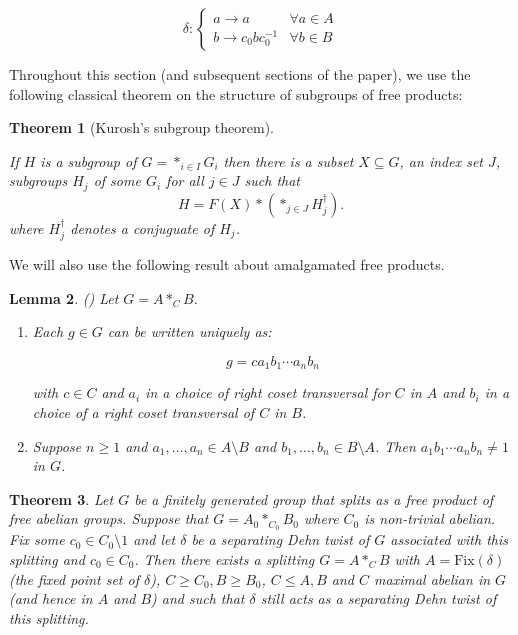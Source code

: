 \documentclass{amsart}
\theoremstyle{plain}
\newtheorem{thm}{Theorem}[section]
\newtheorem{lemma}[thm]{Lemma}
\theoremstyle{definition}
\theoremstyle{remark}
\begin{document}
$$ \delta : \begin{cases}
    a \to a & \forall a \in A \\
    b \to c_0bc_0^{-1} & \forall b \in B
\end{cases} $$

Throughout this section (and subsequent sections of the paper), we use the following classical theorem on the structure of subgroups of free products:

\begin{thm}[Kurosh's subgroup theorem]\cite[Theorem 3.01]{Kuhn}
\label{thm:Kurosh}

If $H$ is a subgroup of $G=*_{i \in I} G_i$ then there is a subset $X \subseteq G$, an index set $J$, subgroups $H_j$ of some $G_i$ for all $j \in J$ such that $$H=F(X) * (*_{j \in J} H_j^{\dag}).$$ 
where $H_j^{\dag}$ denotes a conjuguate of $H_j$. 
\end{thm}

We will also use the following result about amalgamated free products.

\begin{lemma}(\cite[Theorem 2.6]{Lyndon_Schupp})
    \label{lemma: normal form theorem for amalgamated free products}
    Let $G = A *_C B$. 
    
    \begin{enumerate}
        \item Each $g \in G$ can be written uniquely as: 

        $$g = c a_1 b_1 \cdots a_n b_n$$

        with $c \in C$ and $a_i$ in a choice of right coset transversal for $C$ in $A$ and $b_i$ in a choice of a right coset transversal of $C$ in $B$. 
        \item Suppose $n \geq 1$ and $a_1,\ldots,a_n \in A \setminus B$ and $b_1, \ldots, b_n \in B \setminus A$. Then $a_1 b_1 \cdots a_n b_n \neq 1$ in $G$. 
    \end{enumerate}
    
    
    
\end{lemma}

\begin{thm}
    \label{lemma: enlarging the splitting in separating case}
    Let $G$ be a finitely generated group that splits as a free product of free abelian groups. Suppose that $G = A_0 *_{C_0} B_0$ where $C_0$ is non-trivial abelian. Fix some $c_{0} \in C_0 \setminus 1$ and let $\delta$ be a separating Dehn twist of $G$ associated with this splitting and $c_0 \in C_0$. Then there exists a splitting $G = A *_C B$ with $A = \mathrm{Fix}(\delta)$ (the fixed point set of $\delta$), $C \geq C_0, B \geq B_0$, $C \leq A, B$ and $C$ maximal abelian in $G$ (and hence in $A$ and $B$) and such that $\delta$ still acts as a separating Dehn twist of this splitting. 
\end{thm}
\end{document}
